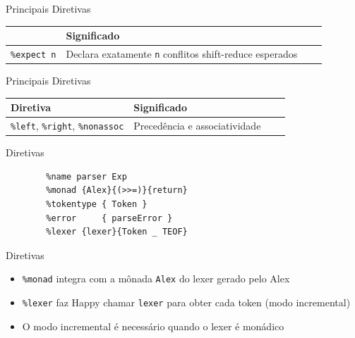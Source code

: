 \begin{frame}[fragile]{Principais Diretivas}

    \begin{table}
        \begin{tabular}{l l l l}
            }
            }@{}}
            \hline
            Diretiva & Significado \\
        \hline
        \texttt{\%expect n} & Declara exatamente
        \texttt{n} conflitos shift-reduce esperados \\
        \hline
    \end{tabular}
\end{table}
\end{frame}

\begin{frame}[fragile]{Principais Diretivas}

    \begin{table}
        \begin{tabular}{l l l l}
            \hline
            Diretiva & Significado \\
            \hline
            \texttt{\%left}, \texttt{\%right},
            \texttt{\%nonassoc} & Precedência e associatividade \\
            \hline
        \end{tabular}
    \end{table}
\end{frame}

\begin{frame}[fragile]{Diretivas}

    \begin{lstlisting}
        %name parser Exp
        %monad {Alex}{(>>=)}{return}
        %tokentype { Token }
        %error     { parseError }
        %lexer {lexer}{Token _ TEOF}
    \end{lstlisting}
\end{frame}

\begin{frame}[fragile]{Diretivas}

    \begin{itemize}

        \item
        \texttt{\%monad} integra com a mônada
        \texttt{Alex} do lexer gerado pelo Alex
        \item
        \texttt{\%lexer} faz Happy chamar
        \texttt{lexer} para obter cada token (modo
        incremental)
        \item
        O modo incremental é necessário quando o lexer é monádico
    \end{itemize}
\end{frame}

